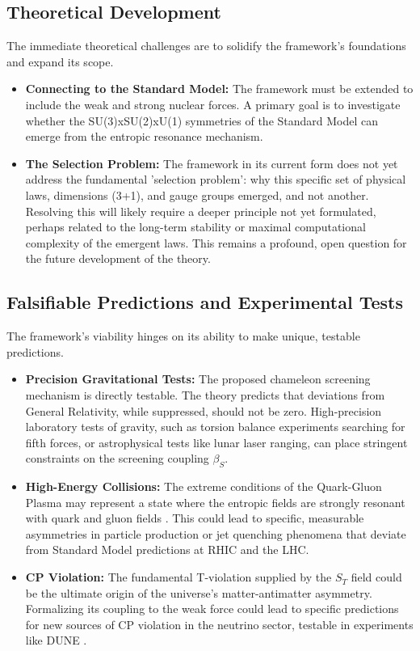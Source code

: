 \documentclass[12pt, a4paper]{article}
\begin{document}
\subsection{Theoretical Development}
The immediate theoretical challenges are to solidify the framework's foundations and expand its scope.
\begin{itemize}
    \item \textbf{Connecting to the Standard Model:} The framework must be extended to include the weak and strong nuclear forces. A primary goal is to investigate whether the SU(3)xSU(2)xU(1) symmetries of the Standard Model can emerge from the entropic resonance mechanism.
    \item \textbf{The Selection Problem:} The framework in its current form does not yet address the fundamental 'selection problem': why this specific set of physical laws, dimensions (3+1), and gauge groups emerged, and not another. Resolving this will likely require a deeper principle not yet formulated, perhaps related to the long-term stability or maximal computational complexity of the emergent laws. This remains a profound, open question for the future development of the theory.
\end{itemize}

\subsection{Falsifiable Predictions and Experimental Tests}
The framework's viability hinges on its ability to make unique, testable predictions.
\begin{itemize}
    \item \textbf{Precision Gravitational Tests:} The proposed chameleon screening mechanism is directly testable. The theory predicts that deviations from General Relativity, while suppressed, should not be zero. High-precision laboratory tests of gravity, such as torsion balance experiments searching for fifth forces, or astrophysical tests like lunar laser ranging, can place stringent constraints on the screening coupling \(\beta_S\).
    \item \textbf{High-Energy Collisions:} The extreme conditions of the Quark-Gluon Plasma may represent a state where the entropic fields are strongly resonant with quark and gluon fields \cite{Jacobs2005}. This could lead to specific, measurable asymmetries in particle production or jet quenching phenomena that deviate from Standard Model predictions at RHIC and the LHC.
    \item \textbf{CP Violation:} The fundamental T-violation supplied by the \(S_T\) field could be the ultimate origin of the universe's matter-antimatter asymmetry. Formalizing its coupling to the weak force could lead to specific predictions for new sources of CP violation in the neutrino sector, testable in experiments like DUNE \cite{T2K2020}.
\end{itemize}
\end{document}
